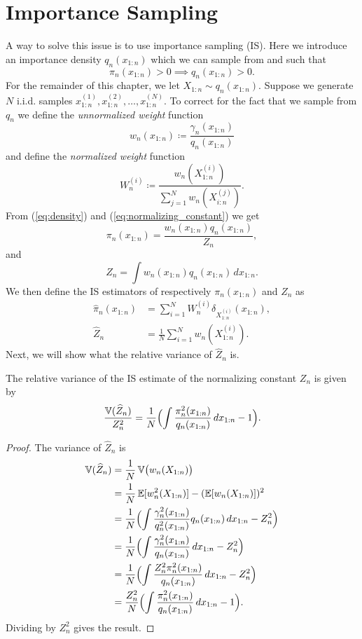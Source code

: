 \section{Importance Sampling}
A way to solve this issue is to use importance sampling (IS). Here we introduce an importance density $q_n(x_{1:n})$ which we can sample from and such that 
\[
\pi_n(x_{1:n})>0 \implies q_n(x_{1:n})>0.
\]
For the remainder of this chapter, we let $X_{1:n} \sim q_n(x_{1:n})$. Suppose we generate $N$ i.i.d. samples $x_{1:n}^{(1)},x_{1:n}^{(2)},\dots,x_{1:n}^{(N)}$. 
To correct for the fact that we sample from $q_n$ we define the \emph{unnormalized weight} function
\[
w_n(x_{1:n}) \coloneq \frac{\gamma_n(x_{1:n})}{q_n(x_{1:n})}
\]
and define the \emph{normalized weight} function
\[
W_n^{(i)} \coloneq \frac{w_n(X_{1:n}^{(i)})}{\sum_{j=1}^N w_n(X_{i:n}^{(j)})}.
\]
From (\ref{eq:density}) and (\ref{eq:normalizing_constant}) we get
\begin{equation}
	\pi_n(x_{1:n})=\frac{w_n(x_{1:n})q_n(x_{1:n})}{Z_n},
\end{equation}
and
\begin{equation}
	Z_n=\int w_n(x_{1:n})q_n(x_{1:n})\, dx_{1:n}.
\end{equation}
We then define the IS estimators of respectively $\pi_n(x_{1:n})$ and $Z_n$ as
\begin{align}
	\widehat{\pi}_n(x_{1:n}) &= \sum_{i=1}^{N}W_n^{(i)} \delta_{X_{1:n}^{(i)}}(x_{1:n}), \label{eq:est_pi} \\
	\widehat{Z}_n &= \frac{1}{N}\sum_{i=1}^{N}w_n(X_{1:n}^{(i)}). \label{eq:est_Z}
\end{align}
Next, we will show what the relative variance of $\widehat{Z}_n$ is.
\begin{theorem}
	\label{thm:rel_var_Z_IS}
	The relative variance of the IS estimate of the  normalizing constant $Z_n$ is given by
	\[
	\frac{\operatorname{\mathbb{V}}(\widehat{Z}_n)}{Z_n^2}=\frac{1}{N}\Bigl(\int \frac{\pi_n^2(x_{1:n})}{q_n(x_{1:n})}\, dx_{1:n}-1\Bigr).
	\]
\end{theorem}
\begin{proof}
	The variance of $\widehat{Z}_n$ is 
	\begin{align*}
		\operatorname{\mathbb{V}}(\widehat{Z}_n)&=\frac{1}{N}\operatorname{\mathbb{V}}\bigl(w_n(X_{1:n})\bigr) \\
		&=\frac{1}{N}\operatorname{\mathbb{E}}[w_n^2(X_{1:n})]-(\operatorname{\mathbb{E}}[w_n(X_{1:n})])^2 \\
		&=\frac{1}{N}\Bigl(\int \frac{\gamma_n^2(x_{1:n})}{q_n^2(x_{1:n})} q_n(x_{1:n})\, dx_{1:n}-Z_n^2\Bigr) \\
		&=\frac{1}{N}\Bigl(\int \frac{\gamma_n^2(x_{1:n})}{q_n(x_{1:n})}\, dx_{1:n}-Z_n^2\Bigr) \\
		&=\frac{1}{N}\Bigl(\int \frac{Z_n^2\pi_n^2(x_{1:n})}{q_n(x_{1:n})}\, dx_{1:n}-Z_n^2\Bigr) \\
		&=\frac{Z_n^2}{N}\Bigl(\int \frac{\pi_n^2(x_{1:n})}{q_n(x_{1:n})}\, dx_{1:n}-1\Bigr).
	\end{align*}
	Dividing by $Z_n^2$ gives the result.
\end{proof}
